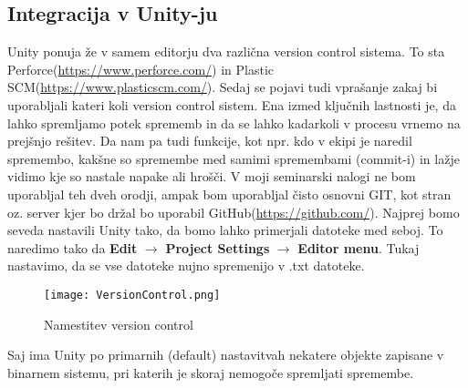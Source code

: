 {\color{indiagreen}\subsection{Integracija v Unity-ju}}
Unity ponuja že v samem editorju dva različna version control sistema. To sta Perforce(\url{https://www.perforce.com/}) in Plastic SCM(\url{https://www.plasticscm.com/}). Sedaj se pojavi tudi vprašanje zakaj bi uporabljali kateri koli version control sistem. Ena izmed ključnih lastnosti je, da lahko spremljamo potek sprememb in da se lahko kadarkoli v procesu vrnemo na prejšnjo rešitev. Da nam pa tudi funkcije, kot npr. kdo v ekipi je naredil spremembo, kakšne so spremembe med samimi spremembami (commit-i) in lažje vidimo kje so nastale napake ali hrošči. 
V moji seminarski nalogi ne bom uporabljal teh dveh orodji, ampak bom uporabljal čisto osnovni GIT, kot stran oz. server kjer bo držal bo uporabil GitHub(\url{https://github.com/}). 
Najprej bomo seveda nastavili Unity tako, da bomo lahko primerjali datoteke med seboj. To naredimo tako da \textbf{Edit} $\rightarrow$ \textbf{Project Settings} $\rightarrow$ \textbf{Editor menu}. Tukaj nastavimo, da se vse datoteke nujno spremenijo v .txt datoteke.\\
\begin{figure}[ht!]
	\centering
	\texttt{[image: VersionControl.png]}
	\caption{Namestitev version control}
\end{figure}
Saj ima Unity po primarnih (default) nastavitvah nekatere objekte zapisane v binarnem sistemu, pri katerih je skoraj nemogoče spremljati spremembe.